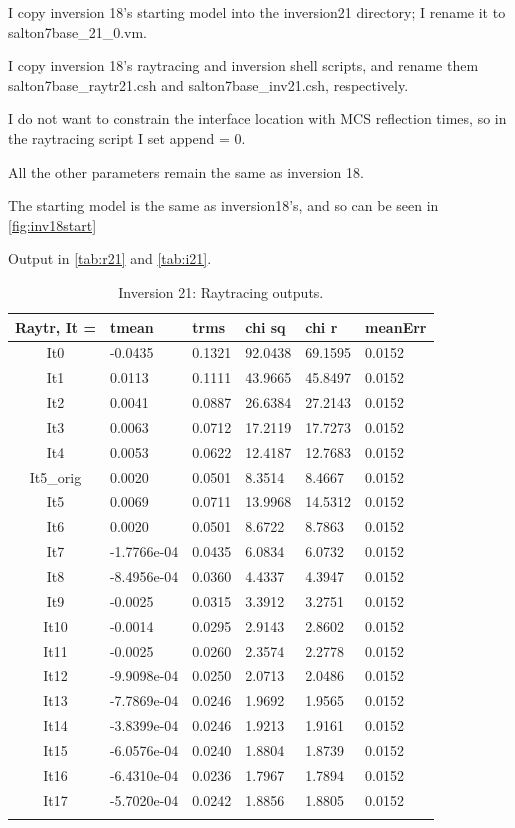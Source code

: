 \documentclass[fontsize=11pt, %
                             paper=a4, %
                             twoside, %
                             captions=tableheading,
                             index=totoc,
                             hyperref]{labbook}
\begin{document}
\begin{addmargin}[4cm]{0cm}
I copy inversion 18's starting model into the inversion21 directory; I rename it to salton7base\_21\_0.vm.

I copy inversion 18's raytracing and inversion shell scripts, and rename them salton7base\_raytr21.csh and salton7base\_inv21.csh, respectively.

I do not want to constrain the interface location with MCS reflection times, so in the raytracing script I set append = 0.   

All the other parameters remain the same as inversion 18.  

The starting model is the same as inversion18's, and so can be seen in \autoref{fig:inv18start}

Output in \autoref{tab:r21} and \autoref{tab:i21}.

\begin{table}[!ht]
\label{tab:r21}
\raggedleft
\begin{tabular}{c l l l l l}
\toprule
\textbf{Raytr, It = } & \textbf{tmean} & \textbf{trms} & \textbf{chi sq} & \textbf{chi r} & \textbf{meanErr} \\
\toprule
It0 & -0.0435 & 0.1321 & 92.0438 & 69.1595 & 0.0152\\
It1 & 0.0113 & 0.1111 & 43.9665 & 45.8497 & 0.0152\\
It2 & 0.0041 & 0.0887 & 26.6384 & 27.2143 & 0.0152\\
It3 & 0.0063 & 0.0712 & 17.2119 & 17.7273 & 0.0152\\
It4 & 0.0053 & 0.0622 & 12.4187 & 12.7683 & 0.0152\\
It5\_orig & 0.0020 & 0.0501 & 8.3514 & 8.4667 & 0.0152\\
It5 & 0.0069 & 0.0711 & 13.9968 & 14.5312 & 0.0152\\
It6 & 0.0020 & 0.0501 & 8.6722 & 8.7863 & 0.0152\\
It7 & -1.7766e-04 & 0.0435 & 6.0834 & 6.0732 & 0.0152\\
It8 & -8.4956e-04 & 0.0360 & 4.4337 & 4.3947 & 0.0152\\
It9 & -0.0025 & 0.0315 & 3.3912 & 3.2751 & 0.0152\\
It10 & -0.0014 & 0.0295 & 2.9143 & 2.8602 & 0.0152\\
It11 & -0.0025 & 0.0260 & 2.3574 & 2.2778 & 0.0152\\
It12 & -9.9098e-04 & 0.0250 & 2.0713 & 2.0486 & 0.0152\\
It13 & -7.7869e-04 & 0.0246 & 1.9692 & 1.9565 & 0.0152\\
It14 & -3.8399e-04 & 0.0246 & 1.9213 & 1.9161 & 0.0152\\
It15 & -6.0576e-04 & 0.0240 & 1.8804 & 1.8739 & 0.0152\\
It16 & -6.4310e-04 & 0.0236 & 1.7967 & 1.7894 & 0.0152\\
It17 & -5.7020e-04 & 0.0242 & 1.8856 & 1.8805 & 0.0152\\
\bottomrule\\
\end{tabular}
\caption{Inversion 21: Raytracing outputs.}
\end{table}


\end{addmargin}
\end{document}
